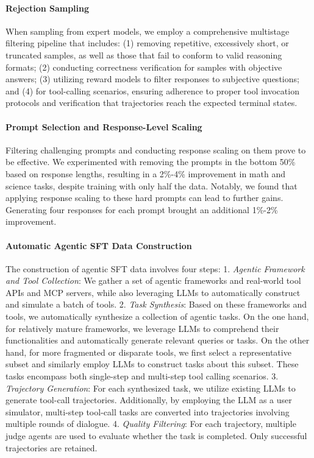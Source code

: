 \documentclass{article}
\theoremstyle{definition}
\begin{document}
\paragraph{Rejection Sampling} When sampling from expert models, we employ a comprehensive multistage filtering pipeline that includes: (1) removing repetitive, excessively short, or truncated samples, as well as those that fail to conform to valid reasoning formats; (2) conducting correctness verification for samples with objective answers; (3) utilizing reward models to filter responses to subjective questions; and (4) for tool-calling scenarios, ensuring adherence to proper tool invocation protocols and verification that trajectories reach the expected terminal states.

\paragraph{Prompt Selection and Response-Level Scaling} Filtering challenging prompts and conducting response scaling on them prove to be effective. We experimented with removing the prompts in the bottom 50\% based on response lengths, resulting in a 2\%-4\% improvement in math and science tasks, despite training with only half the data. Notably, we found that applying response scaling to these hard prompts can lead to further gains. Generating four responses for each prompt brought an additional 1\%-2\% improvement.

\paragraph{Automatic Agentic SFT Data Construction} The construction of agentic SFT data involves four steps: 1. \emph{Agentic Framework and Tool Collection}: We gather a set of agentic frameworks and real-world tool APIs and MCP servers, while also leveraging LLMs to automatically construct and simulate a batch of tools. 2. \emph{Task Synthesis}: Based on these frameworks and tools, we automatically synthesize a collection of agentic tasks. On the one hand, for relatively mature frameworks, we leverage LLMs to comprehend their functionalities and automatically generate relevant queries or tasks. On the other hand, for more fragmented or disparate tools, we first select a representative subset and similarly employ LLMs to construct tasks about this subset. These tasks encompass both single-step and multi-step tool calling scenarios. 3. \emph{Trajectory Generation}: For each synthesized task, we utilize existing LLMs to generate tool-call trajectories. Additionally, by employing the LLM as a user simulator, multi-step tool-call tasks are converted into trajectories involving multiple rounds of dialogue. 4. \emph{Quality Filtering}: For each trajectory, multiple judge agents are used to evaluate whether the task is completed. Only successful trajectories are retained.
\end{document}
